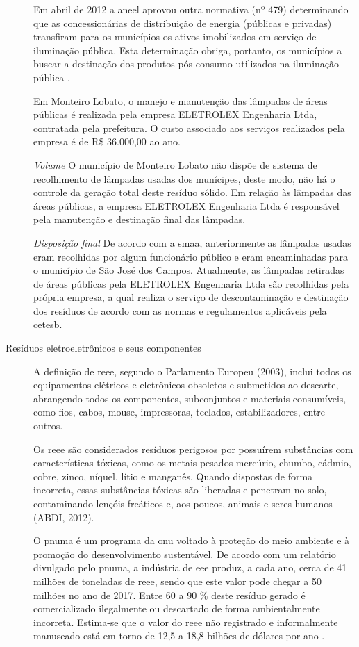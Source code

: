 \begin{description}
	Em abril de 2012 a \gls{aneel} aprovou outra normativa (nº 479) determinando que as concessionárias de distribuição de energia (públicas e privadas) transfiram para os municípios os ativos imobilizados em serviço de iluminação pública. Esta determinação obriga, portanto, os municípios a buscar a destinação dos produtos pós-consumo utilizados na iluminação pública \cite{ANEEL2012}.
	
	Em Monteiro Lobato, o manejo e manutenção das lâmpadas de áreas públicas é realizada pela empresa ELETROLEX Engenharia Ltda, contratada pela prefeitura. O custo associado aos serviços realizados pela empresa é de R\$ 36.000,00 ao ano.
	
	\subitem \textit{Volume}
	O município de Monteiro Lobato não dispõe de sistema de recolhimento de lâmpadas usadas dos munícipes, deste modo, não há o controle da geração total deste resíduo sólido.
	Em relação às lâmpadas das áreas públicas, a empresa ELETROLEX Engenharia Ltda é responsável pela manutenção e destinação final das lâmpadas.
	
	\subitem \textit{Disposição final}
	De acordo com a \gls{smaa}, anteriormente as lâmpadas usadas eram recolhidas por algum funcionário público e eram encaminhadas para o município de São José dos Campos.
	Atualmente, as lâmpadas retiradas de áreas públicas pela ELETROLEX Engenharia Ltda são recolhidas pela própria empresa, a qual realiza o serviço de descontaminação e destinação dos resíduos de acordo com as normas e regulamentos aplicáveis pela \gls{cetesb}.
	
	
	\item[Resíduos eletroeletrônicos e seus componentes] A definição de \gls{reee}, segundo o Parlamento Europeu (2003), inclui todos os equipamentos elétricos e eletrônicos obsoletos e submetidos ao descarte, abrangendo todos os componentes, subconjuntos e materiais consumíveis, como fios, cabos, mouse, impressoras, teclados, estabilizadores, entre outros.
	
	Os \gls{reee} são considerados resíduos perigosos por possuírem substâncias com características tóxicas, como os metais pesados mercúrio, chumbo, cádmio, cobre, zinco, níquel, lítio e manganês. Quando dispostas de forma incorreta, essas substâncias tóxicas são liberadas e penetram no solo, contaminando lençóis freáticos e, aos poucos, animais e seres humanos (ABDI, 2012).
	
	O \gls{pnuma} é um programa da \gls{onu} voltado à proteção do meio ambiente e à promoção do desenvolvimento sustentável. De acordo com um relatório divulgado pelo \gls{pnuma}, a indústria de \gls{eee} produz, a cada ano, cerca de 41 milhões de toneladas de \gls{reee}, sendo que este valor pode chegar a 50 milhões no ano de 2017. Entre 60 a 90 \% deste resíduo gerado é comercializado ilegalmente ou descartado de forma ambientalmente incorreta. Estima-se que o valor do \gls{reee} não registrado e informalmente manuseado está em torno de 12,5 a 18,8 bilhões de dólares por ano \cite{onu2017}.
	

\end{description}
